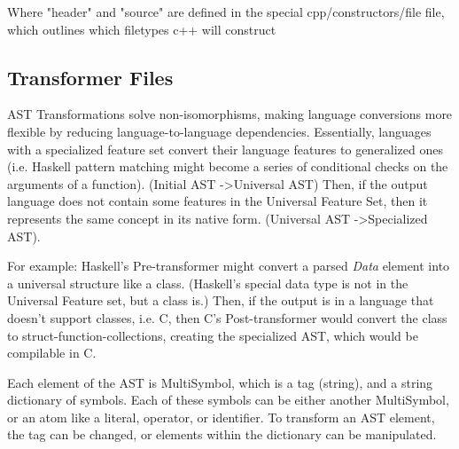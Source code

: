\documentclass{article}
\begin{document}
Where "header" and "source" are defined in the special cpp/constructors/file file, which outlines which filetypes c++ will construct

\subsection{Transformer Files}

AST Transformations solve non-isomorphisms, making language conversions more flexible by reducing language-to-language dependencies.
Essentially, languages with a specialized feature set convert their language features to generalized ones (i.e. Haskell pattern matching might become a series of conditional checks on the arguments of a function). (Initial AST -\textgreater Universal AST)
Then, if the output language does not contain some features in the Universal Feature Set, then it represents the same concept in its native form. (Universal AST -\textgreater Specialized AST).

For example: 
Haskell's Pre-transformer might convert a parsed \textit{Data} element into a universal structure like a class.
(Haskell's special data type is not in the Universal Feature set, but a class is.)
Then, if the output is in a language that doesn't support classes, i.e. C, then C's Post-transformer would convert the class to struct-function-collections, creating the specialized AST, which would be compilable in C.

\newpage
{}
\newpage

Each element of the AST is MultiSymbol, which is a tag (string), and a string dictionary of symbols. Each of these symbols can be either another MultiSymbol, or an atom like a literal, operator, or identifier.
To transform an AST element, the tag can be changed, or elements within the dictionary can be manipulated.
\end{document}
